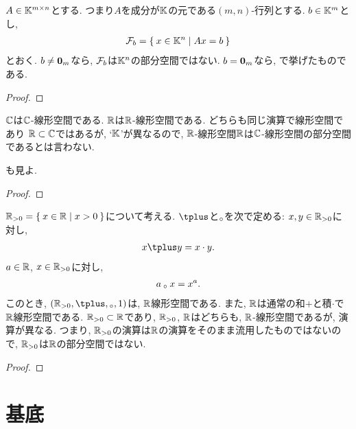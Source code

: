 \begin{example}
  \label{subsp:nonexample:fiber}
  $A\in \mathbb{K}^{m\times n}$とする.
  つまり$A$を成分が$\mathbb{K}$の元である$(m,n)$-行列とする.
  $b\in \mathbb{K}^m$とし,
  \begin{align*}
    \mathcal{F}_b=\Set{x\in \mathbb{K}^n|Ax=b}
  \end{align*}
  とおく.
  $b\neq \boldsymbol{0}_m$なら,
  $\mathcal{F}_b$は$\mathbb{K}^n$の部分空間ではない.
  $b= \boldsymbol{0}_m$なら,
  で挙げたものである.
\end{example}
\begin{proof}\end{proof}



\begin{example}
  \label{subsp:nonexample:cc}
  $\mathbb{C}$は$\mathbb{C}$-線形空間である.
  $\mathbb{R}$は$\mathbb{R}$-線形空間である.
  どちらも同じ演算で線形空間であり
  $\mathbb{R}\subset \mathbb{C}$ではあるが,
  `$\mathbb{K}$'が異なるので,
  $\mathbb{R}$-線形空間$\mathbb{R}$は$\mathbb{C}$-線形空間の部分空間であるとは言わない.

  も見よ.
\end{example}
\begin{proof}\end{proof}

\begin{example}
  $\mathbb{R}_{>0}=\Set{x\in\mathbb{R}|x>0}$について考える.
  $\pplus$と$\mathbin{{}_\circ}$を次で定める:
  $x,y\in\mathbb{R}_{>0}$に対し,
  \begin{align*}
    x\pplus y =x\cdot y.
  \end{align*}
  $a\in\mathbb{R}$, $x\in\mathbb{R}_{>0}$に対し,
  \begin{align*}
    a\mathbin{{}_\circ} x=x^a.
  \end{align*}
  このとき, $(\RR_{>0},\pplus,\aact,1)$は, $\mathbb{R}$線形空間である.
  また, $\mathbb{R}$は通常の和$+$と積$\cdot$で$\mathbb{R}$線形空間である.
  $\mathbb{R}_{>0}\subset \mathbb{R}$であり, $\mathbb{R}_{>0}$, $\mathbb{R}$はどちらも, $\mathbb{R}$-線形空間であるが, 演算が異なる.
  つまり, $\mathbb{R}_{>0}$の演算は$\mathbb{R}$の演算をそのまま流用したものではないので,
  $\mathbb{R}_{>0}$は$\mathbb{R}$の部分空間ではない.
\end{example}
\begin{proof}\end{proof}

\begin{quiz}
\end{quiz}


\chapter{基底}
